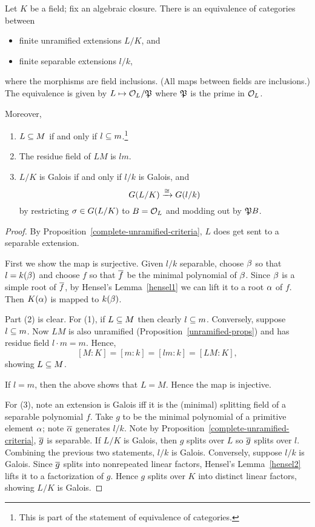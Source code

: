 \begin{thm}
Let $K$ be a field; fix an algebraic closure.
There is an equivalence of categories between
\begin{itemize}
\item finite unramified extensions $L/K$, and  
\item finite separable extensions $l/k$,
\end{itemize}
where the morphisms are field inclusions. (All maps between fields are inclusions.)
The equivalence is given by $L\mapsto \mathcal{O}_L/\mathfrak{P}$ where $\mathfrak{P}$ is the prime in $\mathcal{O}_L$.

Moreover,
\begin{enumerate}
\item $L\subseteq M$ if and only if $l\subseteq m$.\footnote{This is part of the statement of equivalence of categories.}
\item The residue field of $LM$ is $lm$.
\item $L/K$ is Galois if and only if $l/k$ is Galois, and
\[
G(L/K)\xrightarrow{\cong} G(l/k)
\]
by restricting $\sigma\in G(L/K)$ to $B=\mathcal{O}_L$ and modding out by $\mathfrak{P} B$.
\end{enumerate}
\end{thm}
\begin{proof}
By Proposition~\ref{complete-unramified-criteria}, $L$ does get sent to a separable extension.

First we show the map is surjective. Given $l/k$ separable, choose $\beta$ so that $l=k(\beta)$ and choose $f$ so that $\overline{f}$ be the minimal polynomial of $\beta$. Since $\beta$ is a simple root of $\overline{f}$, by Hensel's Lemma~\ref{hensel1} we can lift it to a root $\alpha$ of $f$. Then $K(\alpha)$ is mapped to $k(\beta)$.

Part (2) is clear. For (1), if $L\subseteq M$ then clearly $l\subseteq m$. Conversely, suppose $l\subseteq m$. 
Now $LM$ is also unramified (Proposition~\ref{unramified-props}) and has residue field $l\cdot m=m$. Hence,
\[
[M:K]=[m:k]=[lm:k]=[LM:K],
\] 
showing $L\subseteq M$.

If $l=m$, then the above shows that $L=M$. Hence the map is injective. %

For (3), note an extension is Galois iff it is the (minimal) splitting field of a separable polynomial $f$. Take $g$ to be the minimal polynomial of a primitive element $\alpha$; note $\overline{\alpha}$ generates $l/k$. 
Note by Proposition~\ref{complete-unramified-criteria}, $\overline{g}$ is separable. 
If $L/K$ is Galois, then $g$ splits over $L$ so %
$\overline{g}$ splits over $l$. Combining the previous two statements, $l/k$ is Galois.
Conversely, suppose $l/k$ is Galois. Since $\overline{g}$ splits into nonrepeated linear factors, Hensel's Lemma~\ref{hensel2} lifts it to a factorization of $g$. Hence $g$ splits over $K$ into distinct linear factors, showing $L/K$ is Galois.
\end{proof}
